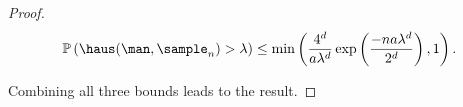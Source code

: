 \begin{proof}
$$\mathbb{P}\left(\haus(\man,\sample_n)>\lambda\right)\leq\min\left(\frac{4^d}{a\lambda^d}\exp\left(\frac{-na\lambda^d}{2^d}\right),1\right).$$

Combining all three bounds leads to the result.

\end{proof}
















